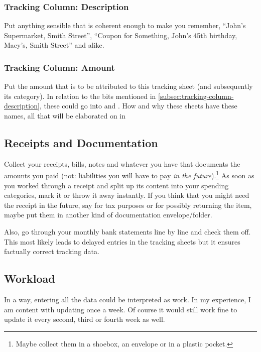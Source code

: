 \subsubsection{Tracking Column: Description}
\label{subsec:tracking-column-description}

Put anything sensible that is coherent enough to make you remember, \eg ``John's Supermarket, Smith Street'', ``Coupon for Something, John's 45th birthday, Macy's, Smith Street'' and alike.

\subsubsection{Tracking Column: Amount}
\label{subsec:tracking-column-amount}

Put the amount that is to be attributed to this tracking sheet (and subsequently its category).
In relation to the bits mentioned in \autoref{subsec:tracking-column-description}, these could go into  and .
How and why these sheets have these names, all that will be elaborated on in

\subsection{Receipts and Documentation}
\label{subsec:receipts}

Collect your receipts, bills, notes and whatever you have that documents the amounts you paid (not: liabilities you will have to pay \emph{in the future}).\footnote{Maybe collect them in a shoebox, an envelope or in a plastic pocket.}
As soon as you worked through a receipt and split up its content into your spending categories, mark it or throw it away instantly.
If you think that you might need the receipt in the future, say for tax purposes or for possibly returning the item, maybe put them in another kind of documentation envelope/folder.

Also, go through your monthly bank statements line by line and check them off.
This most likely leads to delayed entries in the tracking sheets but it ensures factually correct tracking data.

\subsection{Workload}
\label{subsec:workload}

In a way, entering all the data could be interpreted as work.
In my experience, I am content with updating \tfn once a week.
Of course it would still work fine to update it every second, third or fourth week as well.

